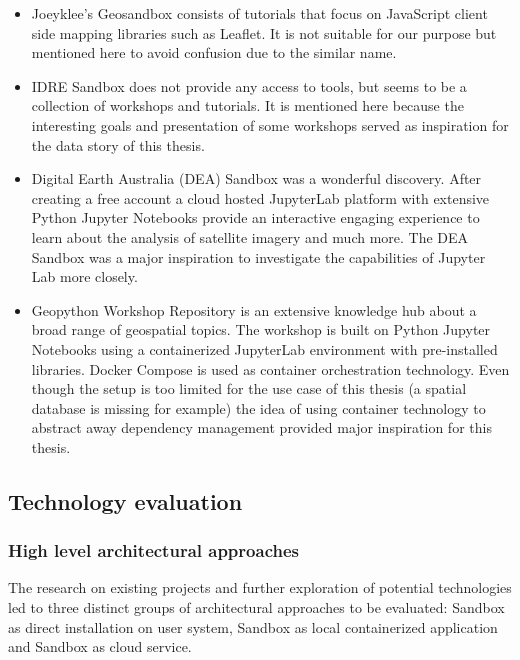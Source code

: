 \documentclass[11pt, a4paper, oneside, parskip=full-]{scrartcl}
\begin{document}
\begin{itemize}
  \item Joeyklee's Geosandbox\cite{project-joeyklee} consists of tutorials that
  focus on JavaScript client side mapping libraries such as Leaflet. It is not
  suitable for our purpose but mentioned here to avoid confusion due to the
  similar name.
  \item IDRE Sandbox\cite{project-idre} does not provide any access to tools,
  but seems to be a collection of workshops and tutorials. It is mentioned here
  because the interesting goals and presentation of some workshops served as
  inspiration for the data story of this thesis.
  \item Digital Earth Australia (DEA) Sandbox\cite{project-dea} was a wonderful
  discovery. After creating a free account a cloud hosted
  JupyterLab\cite{jupyterlab} platform with extensive Python Jupyter Notebooks
  provide an interactive engaging experience to learn about the analysis of
  satellite imagery and much more. The DEA Sandbox was a major inspiration to
  investigate the capabilities of Jupyter Lab more closely.
  \item Geopython Workshop Repository\cite{project-geopython} is an extensive
  knowledge hub about a broad range of geospatial topics. The workshop is built
  on Python Jupyter Notebooks using a containerized JupyterLab environment with
  pre-installed libraries. Docker Compose\cite{dockercompose} is used as
  container orchestration technology. Even though the setup is too limited for
  the use case of this thesis (a spatial database is missing for example) the
  idea of using container technology to abstract away dependency management
  provided major inspiration for this thesis.
\end{itemize}

\subsection{Technology evaluation}

\subsubsection{High level architectural approaches}
The research on existing projects and further exploration of potential
technologies led to three distinct groups of architectural approaches to be
evaluated: Sandbox as direct installation on user system, Sandbox as local
containerized application and Sandbox as cloud service.
\end{document}

